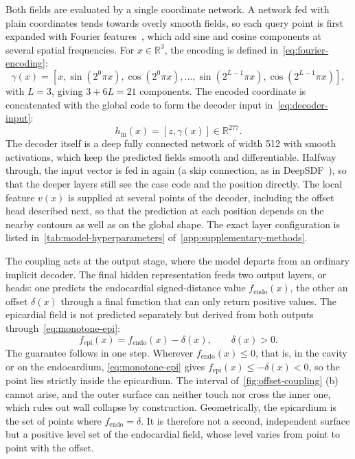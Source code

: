 Both fields are evaluated by a single coordinate network. A
network fed with plain coordinates tends towards overly smooth fields, so each
query point is first expanded with Fourier features~\parencite{tancik2020fourierfeatures}, which add sine and cosine components at
several spatial frequencies. For $x\in\mathbb{R}^3$, the encoding is defined
in~\cref{eq:fourier-encoding}:
\begin{equation}
	\gamma(x) = [x, \sin(2^0\pi x), \cos(2^0\pi x), \ldots,
	\sin(2^{L-1}\pi x), \cos(2^{L-1}\pi x)],
	\label{eq:fourier-encoding}
\end{equation}
with $L=3$, giving $3+6L=21$ components. The encoded coordinate is concatenated
with the global code to form the decoder input in~\cref{eq:decoder-input}:
\begin{equation}
	h_{\mathrm{in}}(x)=[z,\gamma(x)]\in\mathbb{R}^{277}.
	\label{eq:decoder-input}
\end{equation}
The decoder itself is a deep fully connected network of width 512 with
smooth activations, which keep the predicted fields smooth and differentiable.
Halfway through, the input vector is fed in again (a skip connection, as in
DeepSDF~\parencite{deepsdf2019}), so that
the deeper layers still see the case code and the position directly. The
local feature $v(x)$ is supplied at several points of the decoder, including
the offset head described next, so that the prediction at each position
depends on the nearby contours as well as on the global shape. The exact
layer configuration is listed in~\cref{tab:model-hyperparameters}
of~\cref{app:supplementary-methods}.

The coupling acts at the output stage, where the model
departs from an ordinary implicit decoder. The final hidden representation
feeds two output layers, or heads: one predicts the endocardial
signed-distance value $f_{\mathrm{endo}}(x)$, the other an offset $\delta(x)$
through a final function that can only return positive values. The epicardial
field is not predicted separately but derived from both outputs
through~\cref{eq:monotone-epi}:
\begin{equation}
	f_{\mathrm{epi}}(x) = f_{\mathrm{endo}}(x) - \delta(x),
	\qquad \delta(x)>0.
	\label{eq:monotone-epi}
\end{equation}
The guarantee follows in one step. Wherever $f_{\mathrm{endo}}(x)\leq0$, that
is, in the cavity or on the endocardium, \cref{eq:monotone-epi} gives
$f_{\mathrm{epi}}(x)\leq-\delta(x)<0$, so the point lies strictly inside the
epicardium. The interval of~\cref{fig:offset-coupling} (b) cannot arise, and
the outer surface can neither touch nor cross the inner one, which rules out
wall collapse by construction. Geometrically, the epicardium is the set of
points where $f_{\mathrm{endo}}=\delta$. It is therefore not a second,
independent surface but a positive level set of the endocardial field, whose
level varies from point to point with the offset.


